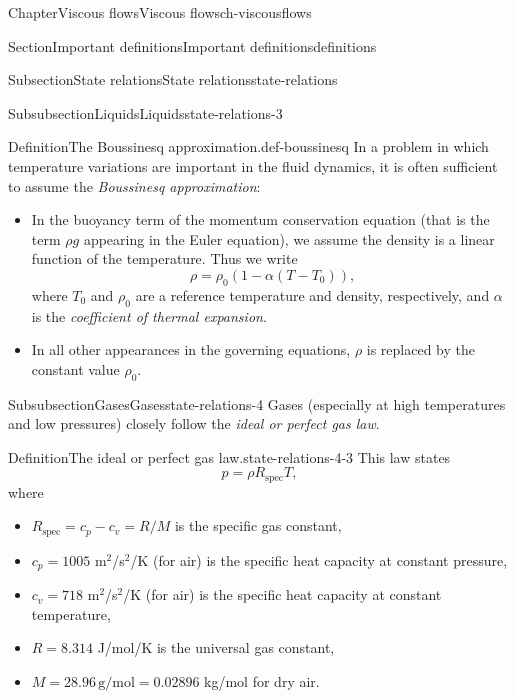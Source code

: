 \documentclass[oneside,10pt,]{book}
\numberwithin{equation}{section}
\begin{document}
\begin{chapterptx}{Chapter}{Viscous flows}{}{Viscous flows}{}{}{ch-viscousflows}
\begin{sectionptx}{Section}{Important definitions}{}{Important definitions}{}{}{definitions}
\begin{subsectionptx}{Subsection}{State relations}{}{State relations}{}{}{state-relations}
\begin{subsubsectionptx}{Subsubsection}{Liquids}{}{Liquids}{}{}{state-relations-3}
\begin{definition}{Definition}{The Boussinesq approximation.}{def-boussinesq}
In a problem in which temperature variations are important in the fluid dynamics, it is often sufficient to assume the \emph{Boussinesq approximation}:%
\begin{itemize}[label=\textbullet]
\item{}In the buoyancy term of the momentum conservation equation (that is the term \(\rho g\) appearing in the Euler equation), we assume the density is a linear function of the temperature. Thus we write%
\begin{equation*}
\rho = \rho_0(1 - \alpha(T - T_0))\text{,}
\end{equation*}
where \(T_0\) and \(\rho_0\) are a reference temperature and density, respectively, and \(\alpha\) is the \emph{coefficient of thermal expansion}.%
\item{}In all other appearances in the governing equations, \(\rho\) is replaced by the constant value \(\rho_0\).%
\end{itemize}
%
\end{definition}
\end{subsubsectionptx}
%
%
\typeout{************************************************}
\typeout{************************************************}
%
\begin{subsubsectionptx}{Subsubsection}{Gases}{}{Gases}{}{}{state-relations-4}
Gases (especially at high temperatures and low pressures) closely follow the \emph{ideal or perfect gas law}.%
\begin{definition}{Definition}{The ideal or perfect gas law.}{state-relations-4-3}%
This law states%
\begin{equation}
p = \rho R_{\textrm{spec}} T,\label{eqn-idealgas}
\end{equation}
where%
\begin{itemize}[label=\textbullet]
\item{}\(R_{\textrm{spec}} = c_p - c_v = R / M\) is the specific gas constant,%
\item{}\(c_p = 1005\) m\(^2\)\slash{}s\(^2\)\slash{}K (for air) is the specific heat capacity at constant pressure,%
\item{}\(c_v = 718\) m\(^2\)\slash{}s\(^2\)\slash{}K (for air) is the specific heat capacity at constant temperature,%
\item{}\(R = 8.314\) J\slash{}mol\slash{}K is the universal gas constant,%
\item{}\(M = 28.96\,\textrm{g/mol}=0.02896\) kg\slash{}mol for dry air.%
\end{itemize}

\end{definition}
\end{subsubsectionptx}
\end{subsectionptx}
\end{sectionptx}
\end{chapterptx}
\end{document}
